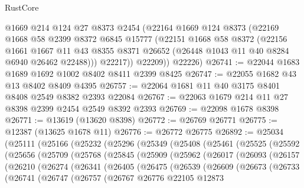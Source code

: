\begin{lexlean}{RustCore}
\begin{coremodule}
          @1669
          @214
          @124
          @27
          @8373
          @2454
          (@22164
            @1669
            @124
            @8373
            (@22169
              @1668
              @58
              @2399
              @8372
              @6845
              @15777
              (@22151
                @1668
                @58
                @8372
                (@22156
                  @1661
                  @1667
                  @11
                  @43
                  @8355
                  @8371
                  @26652
                  (@26448 @1043 @11 @40 @8284 @6940 @26462 @22488)))
              @22217))
          @22209))
      @22226)
@26741 := @22044 @1683 @1689 @1692 @1002 @8402 @8411 @2399 @8425
@26747 := @22055 @1682 @43 @13 @8402 @8409 @4395
@26757 := @22064 @1681 @11 @40 @3175 @8401 @8408 @2549 @8382 @2393 @22084
@26767 := @22063 @1679 @214 @11 @27 @8398 @2399 @2454 @2549 @8392 @2393
@26769 := @22098 @1678 @8398
@26771 := @13619 (@13620 @8398)
@26772 := @26769 @26771
@26775 := @12387 (@13625 @1678 @11)
@26776 := @26772 @26775
@26892 := @25034
    (@25111
      (@25166
        (@25232
          (@25296
            (@25349
              (@25408
                (@25461
                  (@25525
                    (@25592
                      (@25656
                        (@25709
                          (@25768
                            (@25845
                              (@25909
                                (@25962
                                  (@26017
                                    (@26093
                                      (@26157
                                        (@26210
                                          (@26274
                                            (@26341
                                              (@26405
                                                (@26475
                                                  (@26539
                                                    (@26609
                                                      (@26673
                                                        (@26733
                                                          (@26741
                                                            (@26747
                                                              (@26757
                                                                (@26767
                                                                  @26776
                                                                  @22105
                                                                  @12873

\end{coremodule}
\end{lexlean}
